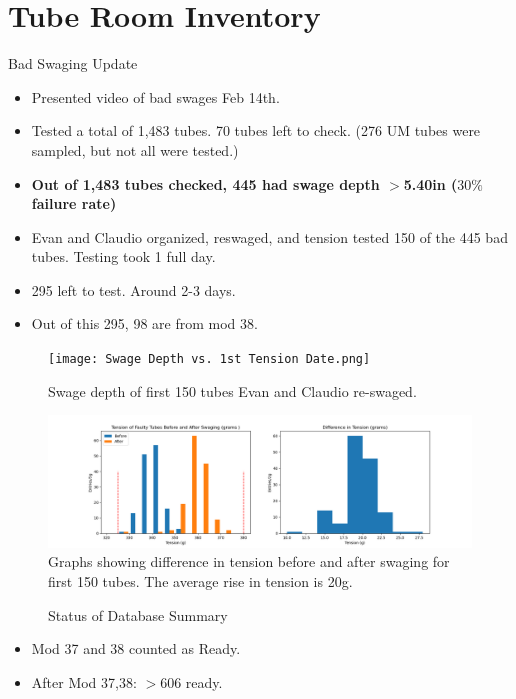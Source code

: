\documentclass{beamer}
\begin{document}
\section{Tube Room Inventory}	
		\begin{frame}{Bad Swaging Update}
			\begin{itemize}
				\item Presented video of bad swages Feb 14th. 
				\item Tested a total of 1,483 tubes. 70 tubes left to check. (276 UM tubes were sampled, but not all were tested.) 
				\item {\bf Out of 1,483 tubes checked, 445 had swage depth $>$5.40in ($30\%$ failure rate)}
				\item Evan and Claudio organized, reswaged, and tension tested 150 of the 445 bad tubes. Testing took 1 full day. 
				\item 295 left to test. Around 2-3 days. 
				\item Out of this 295, 98 are from mod 38.

			\end{itemize}
		\end{frame}
		\begin{frame}
			\begin{figure}
			\centering
			\texttt{[image: Swage Depth vs. 1st Tension Date.png]}
			\caption*{Swage depth of first 150 tubes Evan and Claudio re-swaged.}
			\end{figure}
			
		\end{frame}
		\begin{frame}
			\begin{figure}
				\centering
				\includegraphics[width=0.9\pdfpagewidth]{TensionAfterSwaging.png}
				\caption*{Graphs showing difference in tension before and after swaging for first 150 tubes. The average rise in tension is 20g.}
			\end{figure}
		\end{frame}
		\begin{frame}
			\begin{figure}
				\centering
				\caption*{Status of Database Summary}
				\scalebox{0.6}{}
			\end{figure}
			\begin{itemize}
				\item Mod 37 and 38 counted as Ready.
				\item After Mod 37,38: $>$606 ready.
			\end{itemize}
				

		\end{frame}
		
\end{document}
